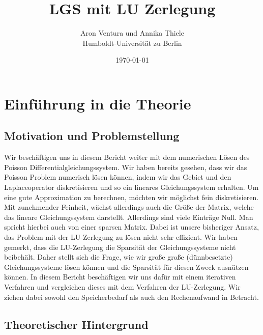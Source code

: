 \documentclass[smallheadings]{scrartcl}
\title{LGS mit LU Zerlegung}
\author{%
 Aron Ventura und Annika Thiele\\ Humboldt-Universit\"at zu Berlin
}
\date{\today}
\theoremstyle{definition}
\begin{document}
\maketitle
\newpage
\tableofcontents
\newpage


\section{Einf\"uhrung in die Theorie}
	\subsection{Motivation und Problemstellung}
		Wir beschäftigen uns in diesem Bericht weiter mit dem numerischen Lösen des 
		Poisson Differentialgleichungssystem.  Wir haben bereits gesehen,  dass wir das 
		Poisson Problem numerisch lösen können, indem wir das Gebiet und den 
		Laplaceoperator diskretisieren und so ein lineares Gleichungssystem erhalten.  Um 
		eine gute Approximation zu berechnen,  möchten wir möglichst fein diskretisieren.  
		Mit zunehmender Feinheit,  wächst allerdings auch die Größe der Matrix,  welche 
		das lineare Gleichungssystem darstellt.  Allerdings sind viele Einträge Null. Man 
		spricht hierbei auch von einer sparsen Matrix. Dabei ist unsere bisheriger Ansatz,  
		das Problem mit der LU-Zerlegung zu lösen nicht sehr effizient.  Wir haben 
		gemerkt,  dass die LU-Zerlegung die Sparsität der Gleichungssysteme nicht 
		beibehält. Daher stellt sich die Frage,  wie wir große große (dünnbesetzte) 
		Gleichungssysteme lösen können und die Sparsität für diesen Zweck ausnützen 
		können.  In diesem Bericht beschäftigen wir uns dafür mit einem iterativen 
		Verfahren und vergleichen dieses mit dem Verfahren der LU-Zerlegung. Wir 
		ziehen dabei sowohl den Speicherbedarf als auch den Rechenaufwand in 
		Betracht. 
	\subsection{Theoretischer Hintergrund}
	
\end{document}
